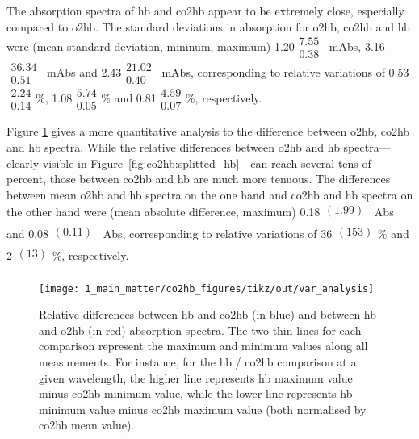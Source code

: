 The absorption spectra of \gls{hb} and \gls{co2hb} appear to be extremely close, especially compared to \mbox{\gls{o2hb}}. The standard deviations in absorption for \gls{o2hb}, \gls{co2hb} and \gls{hb} were (mean standard deviation, mininum, maximum) 1.20$\substack{7.55 \\ 0.38}$~mAbs, 3.16$\substack{36.34 \\ 0.51}$~mAbs and 2.43$\substack{21.02 \\ 0.40}$~mAbs, corresponding to relative variations of 0.53$\substack{2.24 \\ 0.14}$\%, 1.08$\substack{5.74 \\ 0.05}$\% and 0.81$\substack{4.59 \\ 0.07}$\%, respectively.

Figure \ref{fig:co2hb:var_analysis} gives a more quantitative analysis to the difference between \gls{o2hb}, \gls{co2hb} and \gls{hb} spectra. While the relative differences between \gls{o2hb} and \gls{hb} spectra---clearly visible in Figure~\ref{fig:co2hb:splitted_hb}---can reach several tens of percent, those between \gls{co2hb} and \gls{hb} are much more tenuous. The differences between mean \gls{o2hb} and \gls{hb} spectra on the one hand and \gls{co2hb} and \gls{hb} spectra on the other hand were (mean absolute difference, maximum) 0.18$\substack{(1.99) \\ {} }$~Abs and 0.08$\substack{(0.11) \\ {}}$~Abs, corresponding to relative variations of 36$\substack{(153) \\ {}}$\% and 2$\substack{(13) \\ {}}$\%, respectively.

\begin{figure}
	\centering
	\texttt{[image: 1\_main\_matter/co2hb\_figures/tikz/out/var\_analysis]}
	\caption[Relative differences between \gls{hb} / \gls{co2hb} and \gls{hb} / \gls{o2hb} absorption spectra.]{Relative differences between \gls{hb} and \gls{co2hb} (in blue) and between \gls{hb} and \gls{o2hb} (in red) absorption spectra. The two thin lines for each comparison represent the maximum and minimum values along all measurements. For instance, for the \gls{hb} / \gls{co2hb} comparison at a given wavelength, the higher line represents \gls{hb} maximum value minus \gls{co2hb} minimum value, while the lower line represents \gls{hb} minimum value minus \gls{co2hb} maximum value (both normalised by \gls{co2hb} mean value).}
	\label{fig:co2hb:var_analysis}
\end{figure}

